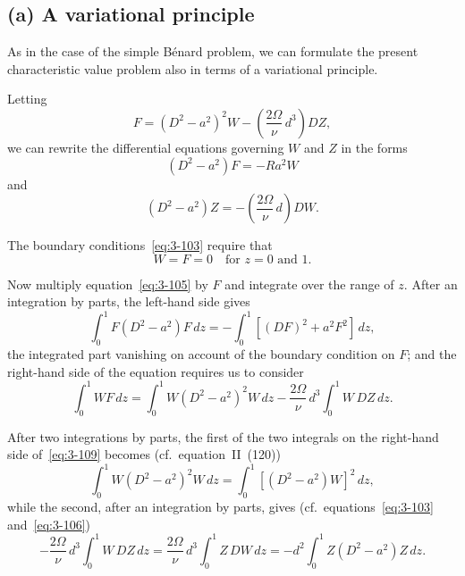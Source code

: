 \subsection*{(a) A variational principle}

As in the case of the simple B\'enard problem, we can formulate the present characteristic value problem also in terms of a variational principle.

Letting
\begin{equation}\label{eq:3-104}
F = (D^2 - a^2)^2 W - \left(\frac{2\Omega}{\nu}\,d^3\right)\!DZ,
\end{equation}
we can rewrite the differential equations governing $W$ and $Z$ in the forms
\begin{equation}\label{eq:3-105}
(D^2 - a^2)F = -Ra^2 W
\end{equation}
and
\begin{equation}\label{eq:3-106}
(D^2 - a^2)Z = -\left(\frac{2\Omega}{\nu}\,d\right)\!DW.
\end{equation}

The boundary conditions~\eqref{eq:3-103} require that
\begin{equation}\label{eq:3-107}
W = F = 0 \quad \text{for } z = 0 \text{ and } 1.
\end{equation}

Now multiply equation~\eqref{eq:3-105} by $F$ and integrate over the range of $z$. After an integration by parts, the left-hand side gives
\begin{equation}\label{eq:3-108}
\int_0^1 F(D^2 - a^2)F\,dz = -\int_0^1 [(DF)^2 + a^2 F^2]\,dz,
\end{equation}
the integrated part vanishing on account of the boundary condition on $F$; and the right-hand side of the equation requires us to consider
\begin{equation}\label{eq:3-109}
\int_0^1 W F\,dz = \int_0^1 W(D^2 - a^2)^2 W\,dz - \frac{2\Omega}{\nu}\,d^3 \int_0^1 W\,DZ\,dz.
\end{equation}

After two integrations by parts, the first of the two integrals on the right-hand side of~\eqref{eq:3-109} becomes (cf.\ equation~II~(120))
\begin{equation}\label{eq:3-110}
\int_0^1 W(D^2 - a^2)^2 W\,dz = \int_0^1 [(D^2 - a^2)W]^2\,dz,
\end{equation}
while the second, after an integration by parts, gives (cf.\ equations~\eqref{eq:3-103} and~\eqref{eq:3-106})
\begin{equation}\label{eq:3-111}
-\frac{2\Omega}{\nu}\,d^3\int_0^1 W\,DZ\,dz = \frac{2\Omega}{\nu}\,d^3\int_0^1 Z\,DW\,dz = -d^2\int_0^1 Z(D^2-a^2)Z\,dz.
\end{equation}

